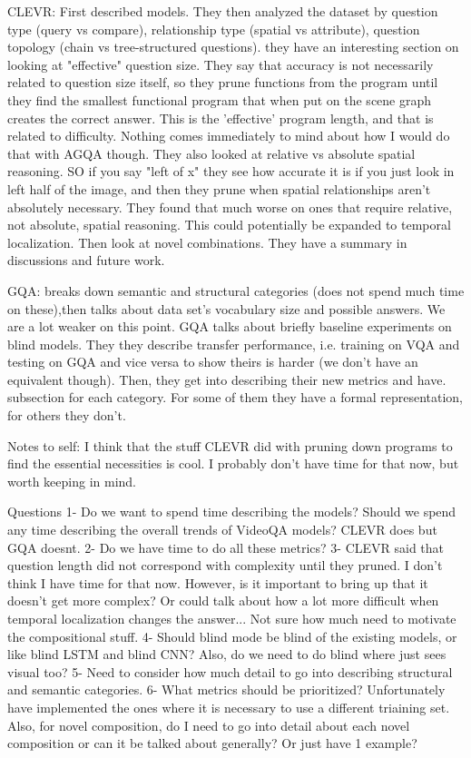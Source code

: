 \documentclass[10pt,twocolumn,letterpaper]{article}
\begin{document}
CLEVR: First described models. They then analyzed the dataset by question type (query vs compare), relationship type (spatial vs attribute), question topology (chain vs tree-structured questions). they have an interesting section on looking at "effective" question size. They say that accuracy is not necessarily related to question size itself, so they prune functions from the program until they find the smallest functional program that when put on the scene graph creates the correct answer. This is the 'effective' program length, and that is related to difficulty. Nothing comes immediately to mind about how I would do that with AGQA though. They also looked at relative vs absolute spatial reasoning. SO if you say "left of x" they see how accurate it is if you just look in left half of the image, and then they prune when spatial relationships aren't absolutely necessary. They found that much worse on ones that require relative, not absolute, spatial reasoning. This could potentially be expanded to temporal localization. Then look at novel combinations. They have a summary in discussions and future work. 

GQA: breaks down semantic and structural categories (does not spend much time on these),then talks about data set's vocabulary size and possible answers. We are a lot weaker on this point. GQA talks about briefly baseline experiments on blind models. They they describe transfer performance, i.e. training on VQA and testing on GQA and vice versa to show theirs is harder (we don't have an equivalent though). Then, they get into describing their new metrics and have. subsection for each category. For some of them they have a formal representation, for others they don't.


Notes to self: I think that the stuff CLEVR did with pruning down programs to find the essential necessities is cool. I probably don't have time for that now, but worth keeping in mind. 

Questions
1- Do we want to spend time describing the models? Should we spend any time describing the overall trends of VideoQA models? CLEVR does but GQA doesnt.
2- Do we have time to do all these metrics?
3- CLEVR said that question length did not correspond with complexity until they pruned. I don't think I have time for that now. However, is it important to bring up that it doesn't get more complex? Or could talk about how a lot more difficult when temporal localization changes the answer... Not sure how much need to motivate the compositional stuff. 
4- Should blind mode be blind of the existing models, or like blind LSTM and blind CNN? Also, do we need to do blind where just sees visual too?
5- Need to consider how much detail to go into describing structural and semantic categories. 
6- What metrics should be prioritized? Unfortunately have implemented the ones where it is necessary to use a different triaining set. Also, for novel composition, do I need to go into detail about each novel composition or can it be talked about generally? Or just have 1 example?
\end{document}
